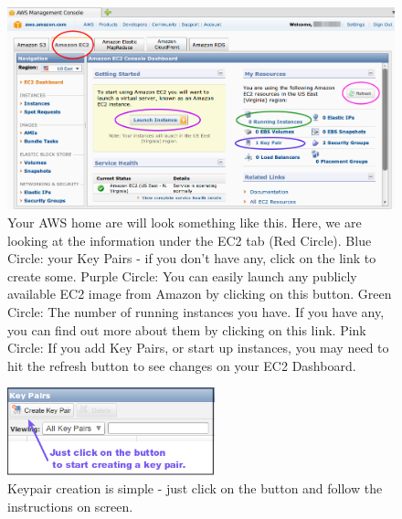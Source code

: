 \begin{figure}[!hd]
	\fbox
	{
		\begin{minipage}{13cm}
\includegraphics[width=\maxwidth]{"images/EC2Homepage2"}
\caption[EC2 Homepage]{\label{fig:ec2homepage}Your AWS home are will look something like this. Here, we are looking at the information under the EC2 tab (Red Circle). Blue Circle: your Key Pairs - if you don't have any, click on the link to create some. Purple Circle: You can easily launch any publicly available EC2 image from Amazon by clicking on this button. Green Circle: The number of running instances you have. If you have any, you can find out more about them by clicking on this link. Pink Circle: If you add Key Pairs, or start up instances, you may need to hit the refresh button to see changes on your EC2 Dashboard.}
		\end{minipage}
	}
\end{figure}


\begin{figure}
\includegraphics[width=60mm]{"images/keypairCreateButton"}
\caption[Keypair creation]{\label{fig:keypaircreate}Keypair creation is simple - just click on the button and follow the instructions on screen.}
\end{figure}

